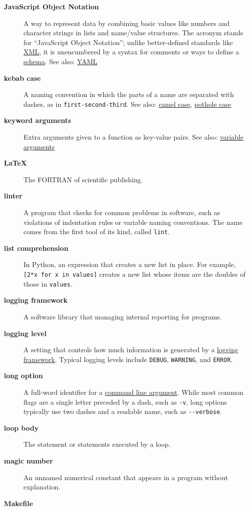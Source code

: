 \documentclass[
]{krantz}
\begin{document}
\begin{description}
\item[\textbf{JavaScript Object Notation}]
A way to represent data by combining basic values like numbers and character strings in lists and name/value structures. The acronym stands for ``JavaScript Object Notation''; unlike better-defined standards like \protect\hyperlink{xml}{XML}, it is unencumbered by a syntax for comments or ways to define a \protect\hyperlink{schema}{schema}. See also: \protect\hyperlink{yaml}{YAML}
\item[\textbf{kebab case}]
A naming convention in which the parts of a name are separated with dashes, as in \texttt{first-second-third}. See also: \protect\hyperlink{camel_case}{camel case}, \protect\hyperlink{pothole_case}{pothole case}
\item[\textbf{keyword arguments}]
Extra arguments given to a function as key-value pairs. See also: \protect\hyperlink{variable_arguments}{variable arguments}
\item[\textbf{LaTeX}]
The FORTRAN of scientific publishing.
\item[\textbf{linter}]
A program that checks for common problems in software, such as violations of indentation rules or variable naming conventions. The name comes from the first tool of its kind, called \texttt{lint}.
\item[\textbf{list comprehension}]
In Python, an expression that creates a new list in place. For example, \texttt{{[}2*x\ for\ x\ in\ values{]}} creates a new list whose items are the doubles of those in \texttt{values}.
\item[\textbf{logging framework}]
A software library that managing internal reporting for programs.
\item[\textbf{logging level}]
A setting that controls how much information is generated by a \protect\hyperlink{logging_framework}{logging framework}. Typical logging levels include \texttt{DEBUG}, \texttt{WARNING}, and \texttt{ERROR}.
\item[\textbf{long option}]
A full-word identifier for a \protect\hyperlink{command_line_argument}{command line argument}. While most common flags are a single letter preceded by a dash, such as \texttt{-v}, long options typically use two dashes and a readable name, such as \texttt{-\/-verbose}.
\item[\textbf{loop body}]
The statement or statements executed by a loop.
\item[\textbf{magic number}]
An unnamed numerical constant that appears in a program without explanation.
\item[\textbf{Makefile}]

\end{description}
\end{document}
